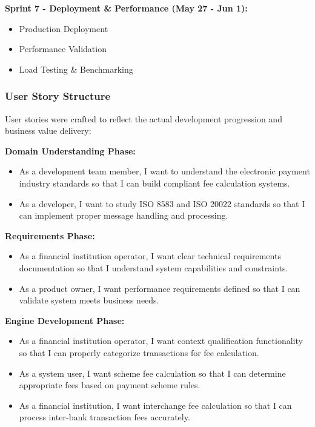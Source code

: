 \textbf{Sprint 7 - Deployment \& Performance (May 27 - Jun 1):}
\begin{itemize}
    \item Production Deployment
    \item Performance Validation
    \item Load Testing \& Benchmarking
\end{itemize}

\subsubsection{User Story Structure}

User stories were crafted to reflect the actual development progression and business value delivery:

\textbf{Domain Understanding Phase:}
\begin{itemize}
    \item As a development team member, I want to understand the electronic payment industry standards so that I can build compliant fee calculation systems.
    \item As a developer, I want to study ISO 8583 and ISO 20022 standards so that I can implement proper message handling and processing.
\end{itemize}

\textbf{Requirements Phase:}
\begin{itemize}
    \item As a financial institution operator, I want clear technical requirements documentation so that I understand system capabilities and constraints.
    \item As a product owner, I want performance requirements defined so that I can validate system meets business needs.
\end{itemize}

\textbf{Engine Development Phase:}
\begin{itemize}
    \item As a financial institution operator, I want context qualification functionality so that I can properly categorize transactions for fee calculation.
    \item As a system user, I want scheme fee calculation so that I can determine appropriate fees based on payment scheme rules.
    \item As a financial institution, I want interchange fee calculation so that I can process inter-bank transaction fees accurately.
\end{itemize}

